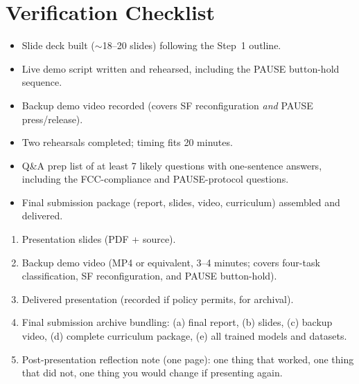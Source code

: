 \documentclass[11pt,letterpaper]{article}
\begin{document}
\section{Verification Checklist}
\begin{itemize}[leftmargin=2em]
	\item[$\square$] Slide deck built ($\sim$18--20 slides) following the Step~1 outline.
	\item[$\square$] Live demo script written and rehearsed, including the PAUSE button-hold sequence.
	\item[$\square$] Backup demo video recorded (covers SF reconfiguration \emph{and} PAUSE press/release).
	\item[$\square$] Two rehearsals completed; timing fits 20 minutes.
	\item[$\square$] \mbox{Q\&A} prep list of at least 7 likely questions with one-sentence answers, including the FCC-compliance and PAUSE-protocol questions.
	\item[$\square$] Final submission package (report, slides, video, curriculum) assembled and delivered.
\end{itemize}

\begin{tcolorbox}[deliverable={Lab Handout 5-H Deliverable --- Capstone Final Submission}]
	\begin{enumerate}[leftmargin=1.2em]
		\item Presentation slides (PDF + source).
		\item Backup demo video (MP4 or equivalent, 3--4 minutes; covers four-task classification, SF reconfiguration, and PAUSE button-hold).
		\item Delivered presentation (recorded if policy permits, for archival).
		\item Final submission archive bundling: (a) final report, (b) slides, (c) backup video, (d) complete curriculum package, (e) all trained models and datasets.
		\item Post-presentation reflection note (one page): one thing that worked, one thing that did not, one thing you would change if presenting again.
	\end{enumerate}
\end{tcolorbox}

\printhandoutglossary
\end{document}
